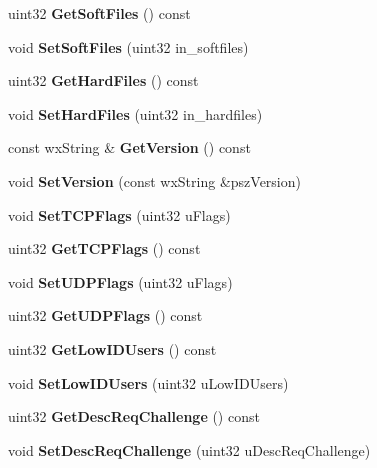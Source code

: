 \begin{DoxyCompactItemize}
\item 
uint32 {\bfseries GetSoftFiles} () const \label{classCServer_a453256a9068ba36572be2083d2b138e0}

\item 
void {\bfseries SetSoftFiles} (uint32 in\_\-softfiles)\label{classCServer_a6f7985c45610a17a34c45ce641176f71}

\item 
uint32 {\bfseries GetHardFiles} () const \label{classCServer_ad55aacecd8c41398e8f6e865f92d8a53}

\item 
void {\bfseries SetHardFiles} (uint32 in\_\-hardfiles)\label{classCServer_aa640121778cb5719fb80cafbf11d48d8}

\item 
const wxString \& {\bfseries GetVersion} () const \label{classCServer_a8897f483dc35ad43c2679f30b9bd8d64}

\item 
void {\bfseries SetVersion} (const wxString \&pszVersion)\label{classCServer_a00cad4386b3f6a074bffec4b99d05933}

\item 
void {\bfseries SetTCPFlags} (uint32 uFlags)\label{classCServer_ae5d7df89b51013aec8f4940393948a18}

\item 
uint32 {\bfseries GetTCPFlags} () const \label{classCServer_abfb469f06c2cf84e90eba4722d61a028}

\item 
void {\bfseries SetUDPFlags} (uint32 uFlags)\label{classCServer_a3e0efab19adfd0288488efe28fa8a8d5}

\item 
uint32 {\bfseries GetUDPFlags} () const \label{classCServer_ae32175d7a76a8be1a4d56d99f75a555e}

\item 
uint32 {\bfseries GetLowIDUsers} () const \label{classCServer_a322768f3e6dd18a9e1c45d357f201fbd}

\item 
void {\bfseries SetLowIDUsers} (uint32 uLowIDUsers)\label{classCServer_a4c41e1f0a833101e255fb06264ed99e5}

\item 
uint32 {\bfseries GetDescReqChallenge} () const \label{classCServer_a066ac3614bced2722dcaf7d156ffa3ec}

\item 
void {\bfseries SetDescReqChallenge} (uint32 uDescReqChallenge)\label{classCServer_a155f0fac2db8dad33a15d0a95989bb02}


\end{DoxyCompactItemize}
